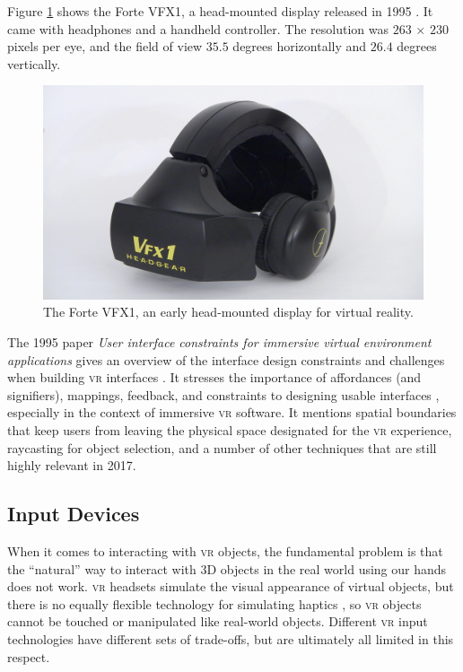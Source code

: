 \documentclass[nobib]{tufte-book} %
\begin{document}
Figure \ref{fig:forte} shows the Forte VFX1, a head-mounted display released in 1995 \cite{fortevfx1}. It came with headphones and a handheld controller. The resolution was $263$ $\times$ $230$ pixels per eye, and the field of view $35.5$ degrees horizontally and $26.4$ degrees vertically.

\begin{figure}
  \includegraphics{forte-vfx1.jpg}
  \caption{The Forte VFX1, an early head-mounted display for virtual reality.}
  \label{fig:forte}
\end{figure}

The 1995 paper \emph{User interface constraints for immersive virtual environment applications} gives an overview of the interface design constraints and challenges when building \textsc{vr} interfaces \cite{bowman1995user}. It stresses the importance of affordances (and signifiers), mappings, feedback, and constraints to designing usable interfaces \cite{norman2013design}, especially in the context of immersive \textsc{vr} software. It mentions spatial boundaries that keep users from leaving the physical space designated for the \textsc{vr} experience, raycasting for object selection, and a number of other techniques that are still highly relevant in 2017.

\subsection{Input Devices}
When it comes to interacting with \textsc{vr} objects, the fundamental problem is that the ``natural'' way to interact with 3D objects in the real world using our hands does not work. \textsc{vr} headsets simulate the visual appearance of virtual objects, but there is no equally flexible technology for simulating haptics \cite{burdea1999keynote}, so \textsc{vr} objects cannot be touched or manipulated like real-world objects. Different \textsc{vr} input technologies have different sets of trade-offs, but are ultimately all limited in this respect.
\end{document}
